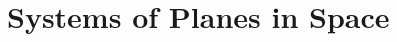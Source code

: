 \documentclass[00-livre-main.tex]{subfiles}
\begin{document}
\chapter{Systems of Planes in Space}
\end{document}
